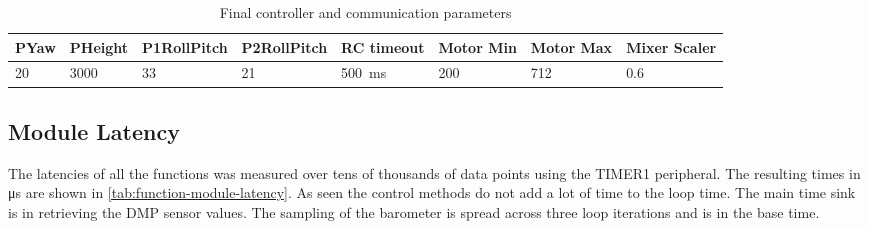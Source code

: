 \documentclass[final]{article}
\begin{document}
\begin{table}[H]
    \caption{Final controller and communication parameters}
    \label{tab:final-controller-values}
    \centering
    \begin{tabular}{llllllll}
    \toprule
    PYaw                   & PHeight & P1RollPitch & P2RollPitch & RC timeout & Motor Min & Motor Max & Mixer Scaler \\
    \midrule
    \num{20} & \num{3000} & \num{33} & \num{21} & \SI{500}{\milli\second} & \num{200} & \num{712} & \num{0.6} \\
    \bottomrule
    \end{tabular}
\end{table}

\subsection{Module Latency}
\label{ssec:module-latency}
The latencies of all the functions was measured over tens of thousands of data points using the TIMER1 peripheral.
The resulting times in \si{\micro\second} are shown in \cref{tab:function-module-latency}.
As seen the control methods do not add a lot of time to the loop time.
The main time sink is in retrieving the DMP sensor values.
The sampling of the barometer is spread across three loop iterations and is in the base time.
\end{document}
